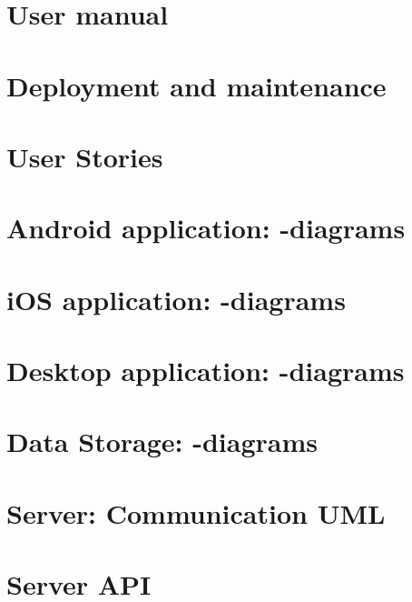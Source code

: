 \begin{appendix}

\chapter{User manual}


\chapter{Deployment and maintenance}


\chapter{User Stories}

\newpage
\FloatBarrier
\chapter{Android application: -diagrams}


\newpage
\FloatBarrier
\vspace*{4cm}
\chapter{iOS application: -diagrams}


\newpage
\vspace*{4cm}
\chapter{Desktop application: -diagrams}
\label{chap:des_appendix}


\chapter{Data Storage: -diagrams}
\label{chap:dat_umls}


\chapter{Server: Communication UML}



\chapter{Server API}



\end{appendix}
